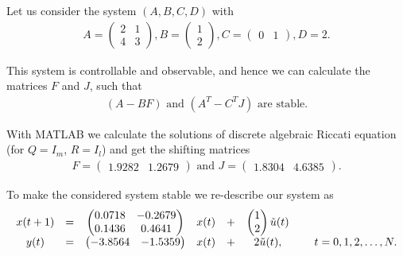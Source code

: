 \begin{exam}
	\label{ex:ILC:LQR}
Let us consider the system $(A,B,C,D)$ with 
\begin{align}
\label{eq:ILC:Sys_ex1_origin}
A = \begin{pmatrix}
2 & 1 \\  4 & 3
\end{pmatrix}, B = \begin{pmatrix}
1 \\ 2
\end{pmatrix}, C = \begin{pmatrix}
0 & 1
\end{pmatrix}, D = 2.
\end{align}

This system is controllable and observable, and hence we can calculate the matrices $F$ and $J$, such that 
\begin{align}
(A - BF) \text{ and } (A^T - C^T J) \text{ are stable}. 
\end{align}

With MATLAB we calculate the solutions of discrete algebraic Riccati equation (for $Q = I_m$, $R = I_l$) and get the shifting matrices 
\begin{align}
F =\begin{pmatrix}
 1.9282   & 1.2679
\end{pmatrix} \text{ and } 
J = \begin{pmatrix}
1.8304  &  4.6385
\end{pmatrix}. 
\end{align}


To make the considered system stable we re-describe our system as
\begin{align}
\label{eq:ILC:Sys_ex1}
\begin{array}{c c c c c c c c c}
x(t+1) &=&
\begin{pmatrix}
0.0718  & -0.2679\\
0.1436  &  0.4641
\end{pmatrix}
& x(t) &+& 
\begin{pmatrix}
1 \\ 2
\end{pmatrix}
\tilde{u}(t)& &
\\ 
y(t)   &=& \begin{pmatrix}
	-3.8564 &   -1.5359
\end{pmatrix}
& x(t)& +&
 2 \tilde{u} (t),& &\; t = 0, 1, 2, \dots, N. 
\end{array}
\end{align} 


\end{exam}
